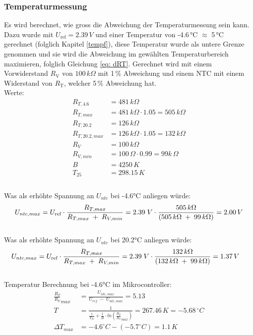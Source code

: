 \subsubsection{Temperaturmessung}
Es wird berechnet, wie gross die Abweichung der Temperaturmessung sein kann. Dazu wurde mit $U_\text{ref} = 2.39\,V$ und einer Temperatur von -4.6\,°C $\approx$ 5\,°C  gerechnet (folglich Kapitel \ref{tempf}), diese Temperatur wurde als untere Grenze genommen und sie wird die Abweichung im gewählten Temperaturbereich maximieren, folglich Gleichung \ref{eq: dRT}. Gerechnet wird mit einem Vorwiderstand $R_{\text{V}}$ von $100\,k\Omega$ mit 1\,\% Abweichung und einem NTC mit einem Widerstand von $R_{\text{T}}$, welcher 5\,\% Abweichung hat.
\\
Werte:
\begin{align*}
R_{T,4.6} &= 481\,k\Omega\\
R_{T,max} &= 481\,k\Omega \cdot 1.05 = 505\,k\Omega\\
R_{T,20.2} &= 126\,k\Omega\\
R_{T,20.2,max} &= 126\,k\Omega \cdot 1.05 = 132\,k\Omega\\
R_V &= 100\,k\Omega\\
R_{V,min} &= 100\,\Omega \cdot 0.99 = 99k\,\Omega\\
B &= 4250\,K\\
T_{25} &= 298.15\,K\\
\end{align*}
\\
Was als erhöhte Spannung an $U_{ntc}$ bei -4.6°C anliegen würde:
\begin{align}
U_{ntc,max} &= U_{\text{ref}} \cdot \frac{R_{T,max}}{R_{T,max}\;+\;R_{V,min}} = 2.39\;V \cdot \frac{ 505\,k\Omega}{(505\,k\Omega\;+\;99\,k\Omega)} = 2.00\,V\label{eq: U_{ntc,max}} \\
\end{align}
\\
Was als erhöhte Spannung an $U_{ntc}$ bei 20.2°C anliegen würde:
\begin{align}
U_{ntc,max} &= U_{\text{ref}} \cdot \frac{R_{T,max}}{R_{T,max}\;+\;R_{V,min}} = 2.39\;V \cdot \frac{ 132\,k\Omega}{(132\,k\Omega\;+\;99\,k\Omega)} = 1.37\,V\label{eq: U_{ntc,20.2,max}}
\end{align}
\\
Temperatur Berechnung bei -4.6°C im Mikrocontroller:
\begin{align}
\frac{R_T}{R_V}_{max} &= \frac{U_{ntc,max}}{U_{ref}\;-\;U_{ntc,max}} = 5.13\\
T &= \frac{1}{\frac{1}{T_{25}}+\frac{1}{B} \cdot ln(\frac{R_T}{R_V}_{max})} = 267.46\,K = -5.68\,^\circ C\\
\Delta T_{max} &= -4.6^\circ C - (-5.7^\circ C) = 1.1\,K
\end{align}
